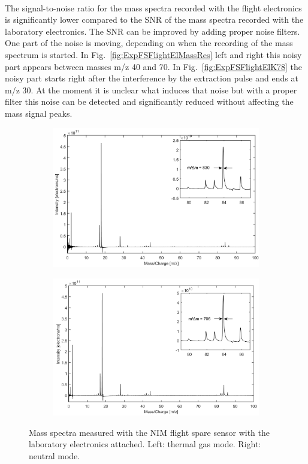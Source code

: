		\\
		The signal-to-noise ratio for the mass spectra recorded with the flight electronics is significantly lower compared to the SNR of the mass spectra recorded with the laboratory electronics. The SNR can be improved by adding proper noise filters. One part of the noise is moving, depending on when the recording of the mass spectrum is started. In Fig.~\ref{fig:ExpFSFlightElMassRes} left and right this noisy part appears between masses m/z 40 and 70. In Fig.~\ref{fig:ExpFSFlightElK78} the noisy part starts right after the interference by the extraction pulse and ends at m/z 30. At the moment it is unclear what induces that noise but with a proper filter this noise can be detected and significantly reduced without affecting the mass signal peaks.\\
		\begin{figure}[H]
			\begin{subfigure}{0.5\textwidth}
				\centering
				\includegraphics[width = \textwidth]{Experiments/FSLabthMode.png}
			\end{subfigure}
			\begin{subfigure}{0.5\textwidth}
				\centering
				\includegraphics[width = \textwidth]{Experiments/FSLabnMode.png}
			\end{subfigure}
			\caption{Mass spectra measured with the NIM flight spare sensor with the laboratory electronics attached. Left: thermal gas mode. Right: neutral mode.}
			\label{fig:ExpFSFlightSenMassRes}
		\end{figure}
